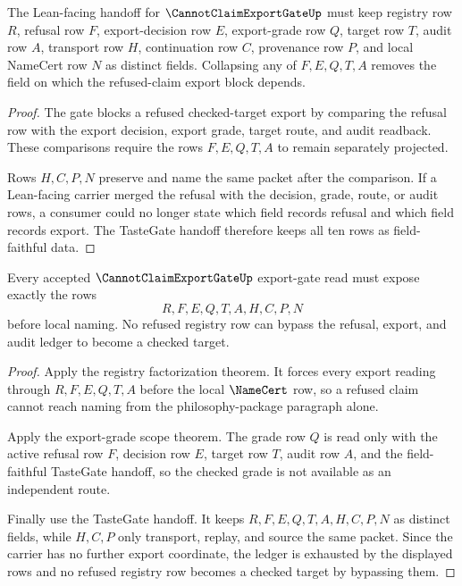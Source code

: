 \begin{theorem}
\label{thm:cannot-claim-export-gate-tastegate-handoff}
The Lean-facing handoff for $\CannotClaimExportGateUp$ must keep registry row $R$, refusal row $F$, export-decision row $E$, export-grade row $Q$, target row $T$, audit row $A$, transport row $H$, continuation row $C$, provenance row $P$, and local NameCert row $N$ as distinct fields. Collapsing any of $F,E,Q,T,A$ removes the field on which the refused-claim export block depends.
\end{theorem}
\begin{proof}
The gate blocks a refused checked-target export by comparing the refusal row with the export decision, export grade, target route, and audit readback. These comparisons require the rows $F,E,Q,T,A$ to remain separately projected.

Rows $H,C,P,N$ preserve and name the same packet after the comparison. If a Lean-facing carrier merged the refusal with the decision, grade, route, or audit rows, a consumer could no longer state which field records refusal and which field records export. The TasteGate handoff therefore keeps all ten rows as field-faithful data.
\end{proof}

\begin{theorem}
\label{thm:cannot-claim-export-gate-ledger-exhaustion}
Every accepted $\CannotClaimExportGateUp$ export-gate read must expose exactly the rows
$$
R,F,E,Q,T,A,H,C,P,N
$$
before local naming. No refused registry row can bypass the refusal, export, and audit ledger to become a checked target.
\end{theorem}
\begin{proof}
Apply the registry factorization theorem. It forces every export reading through $R,F,E,Q,T,A$ before the local $\NameCert$ row, so a refused claim cannot reach naming from the philosophy-package paragraph alone.

Apply the export-grade scope theorem. The grade row $Q$ is read only with the active refusal row $F$, decision row $E$, target row $T$, audit row $A$, and the field-faithful TasteGate handoff, so the checked grade is not available as an independent route.

Finally use the TasteGate handoff. It keeps $R,F,E,Q,T,A,H,C,P,N$ as distinct fields, while $H,C,P$ only transport, replay, and source the same packet. Since the carrier has no further export coordinate, the ledger is exhausted by the displayed rows and no refused registry row becomes a checked target by bypassing them.
\end{proof}

